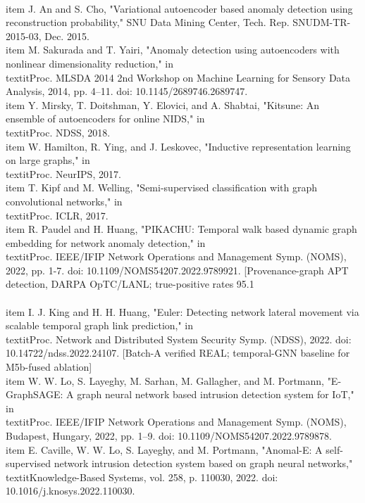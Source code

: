 \documentclass[12pt,a4paper,oneside]{report}
\begin{document}
\\item J. An and S. Cho, "Variational autoencoder based anomaly detection using reconstruction probability," SNU Data Mining Center, Tech. Rep. SNUDM-TR-2015-03, Dec. 2015.
\\item M. Sakurada and T. Yairi, "Anomaly detection using autoencoders with nonlinear dimensionality reduction," in \\textit{Proc. MLSDA 2014 2nd Workshop on Machine Learning for Sensory Data Analysis}, 2014, pp. 4–11. doi: 10.1145/2689746.2689747.
\\item Y. Mirsky, T. Doitshman, Y. Elovici, and A. Shabtai, "Kitsune: An ensemble of autoencoders for online NIDS," in \\textit{Proc. NDSS}, 2018.
\\item W. Hamilton, R. Ying, and J. Leskovec, "Inductive representation learning on large graphs," in \\textit{Proc. NeurIPS}, 2017.
\\item T. Kipf and M. Welling, "Semi-supervised classification with graph convolutional networks," in \\textit{Proc. ICLR}, 2017.
\\item R. Paudel and H. Huang, "PIKACHU: Temporal walk based dynamic graph embedding for network anomaly detection," in \\textit{Proc. IEEE/IFIP Network Operations and Management Symp. (NOMS)}, 2022, pp. 1-7. doi: 10.1109/NOMS54207.2022.9789921. [Provenance-graph APT detection, DARPA OpTC/LANL; true-positive rates 95.1\\%
\\item I. J. King and H. H. Huang, "Euler: Detecting network lateral movement via scalable temporal graph link prediction," in \\textit{Proc. Network and Distributed System Security Symp. (NDSS)}, 2022. doi: 10.14722/ndss.2022.24107. [Batch-A verified REAL; temporal-GNN baseline for M5b-fused ablation]
\\item W. W. Lo, S. Layeghy, M. Sarhan, M. Gallagher, and M. Portmann, "E-GraphSAGE: A graph neural network based intrusion detection system for IoT," in \\textit{Proc. IEEE/IFIP Network Operations and Management Symp. (NOMS)}, Budapest, Hungary, 2022, pp. 1–9. doi: 10.1109/NOMS54207.2022.9789878.
\\item E. Caville, W. W. Lo, S. Layeghy, and M. Portmann, "Anomal-E: A self-supervised network intrusion detection system based on graph neural networks," \\textit{Knowledge-Based Systems}, vol. 258, p. 110030, 2022. doi: 10.1016/j.knosys.2022.110030.
\end{document}
